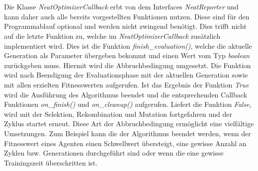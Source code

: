 \\\\
Die Klasse \emph{NeatOptimizerCallback} erbt von dem Interfaces \emph{NeatReporter} und kann daher auch alle bereits vorgestellten Funktionen nutzen. Diese sind für den Programmablauf optional und werden nicht zwingend benötigt. Dies trifft nicht auf die letzte Funktion zu, welche im \emph{NeatOptimizerCallback} zusätzlich implementiert wird. Dies ist die Funktion \emph{finish\_evaluation()}, welche die aktuelle Generation als Parameter übergeben bekommt und einen Wert vom Typ \emph{boolean} zurückgeben muss. Hiermit wird die Abbruchbedingung umgesetzt. Die Funktion wird nach Beendigung der Evaluationsphase mit der aktuellen Generation sowie mit allen erzielten Fitnesswerten aufgerufen. Ist das Ergebnis der Funktion \emph{True} wird die Ausführung des Algorithmus beendet und die entsprechenden Callback Funktionen \emph{on\_finish()} und \emph{on\_cleanup()} aufgerufen. Liefert die Funktion \emph{False}, wird mit der Selektion, Rekombination und Mutation fortgefahren und der Zyklus startet erneut. Diese Art der Abbruchbedingung ermöglicht eine vielfältige Umsetzungen. Zum Beispiel kann die der Algorithmus beendet werden, wenn der Fitnesswert eines Agenten einen Schwellwert übersteigt, eine gewisse Anzahl an Zyklen bzw. Generationen durchgeführt sind oder wenn die eine gewisse Trainingszeit überschritten ist.

